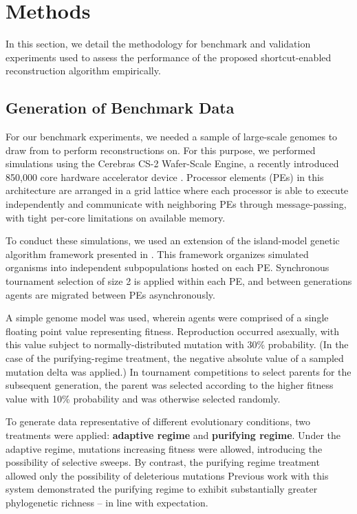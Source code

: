 \section{Methods} \label{sec:methods}

In this section, we detail the methodology for benchmark and validation experiments used to assess the performance of the proposed shortcut-enabled reconstruction algorithm empirically.

\subsection{Generation of Benchmark Data}

For our benchmark experiments, we needed a sample of large-scale genomes to draw from to perform reconstructions on.
For this purpose, we performed simulations using the Cerebras CS-2
Wafer-Scale Engine, a recently introduced 850,000 core hardware accelerator device \citep{lie2023cerebras}.
Processor elements (PEs) in this architecture are arranged in a grid lattice where each processor is able to execute independently and communicate with neighboring PEs through message-passing, with tight per-core limitations on available memory.

To conduct these simulations, we used an extension of the island-model genetic algorithm framework presented in \citep{moreno2024trackable}.
This framework organizes simulated organisms into independent subpopulations hosted on each PE.
Synchronous tournament selection of size 2 is applied within each PE, and between generations agents are migrated between PEs asynchronously.


A simple genome model was used, wherein agents were comprised of a single floating point value representing fitness.
Reproduction occurred asexually, with this value subject to normally-distributed mutation with 30\% probability.
(In the case of the purifying-regime treatment, the negative absolute value of a sampled mutation delta was applied.)
In tournament competitions to select parents for the subsequent generation, the parent was selected according to the higher fitness value with 10\% probability and was otherwise selected randomly.

To generate data representative of different evolutionary conditions, two treatments were applied:
\textbf{adaptive regime} and \textbf{purifying regime}.
Under the adaptive regime, mutations increasing fitness were allowed, introducing the possibility of selective sweeps.
By contrast, the purifying regime treatment allowed only the possibility of deleterious mutations
Previous work with this system demonstrated the purifying regime to exhibit substantially greater phylogenetic richness -- in line with expectation.

